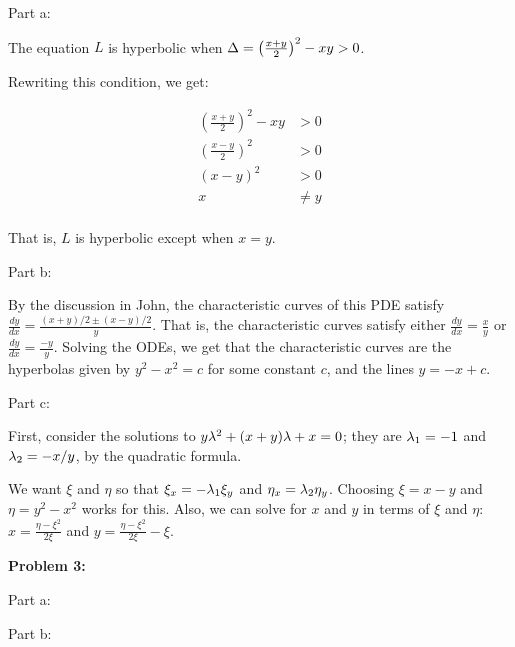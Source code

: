 \documentclass[a4paper,12pt]{article}
\begin{document}
Part a:

The equation $L$ is hyperbolic when $\Delta = \left(\frac{x+y}{2}\right)^2 - xy >0$. 

Rewriting this condition, we get:

\begin{align*}
\left(\frac{x+y}{2}\right)^2 - xy &>0\\
\left(\frac{x-y}{2}\right)^2&>0\\
\left(x-y\right)^2&>0\\
x &\neq y\\
\end{align*}

That is, $L$ is hyperbolic except when $x=y$. 

\shunt

Part b:

By the discussion in John, the characteristic curves of this PDE satisfy $\frac{dy}{dx} = \frac{(x+y)/2 \pm (x-y)/2}{y}$. That is, the characteristic curves satisfy either $\frac{dy}{dx} = \frac{x}{y}$ or $\frac{dy}{dx} = \frac{-y}{y}$. Solving the ODEs, we get that the characteristic curves are the hyperbolas given by $y^2-x^2 = c$ for some constant $c$, and the lines $y= -x + c$. %

\shunt

Part c:

First, consider the solutions to $y\lambda^2 + (x+y)\lambda + x = 0$; they are $\lambda_1=-1$ and $\lambda_2 = -x/y$, by the quadratic formula.

We want $\xi$ and $\eta$ so that $\xi_x = -\lambda_1 \xi_y$ and $\eta_x = \lambda_2 \eta_y$. Choosing $\xi=x-y$ and $\eta=y^2-x^2$ works for this. Also, we can solve for $x$ and $y$ in terms of $\xi$ and $\eta$: $x=\frac{\eta-\xi^2}{2\xi}$ and $y= \frac{\eta-\xi^2}{2\xi}-\xi$.

\shunt

{\bf Problem 3:}

Part a:

\shunt

Part b:

\shunt
\end{document}
